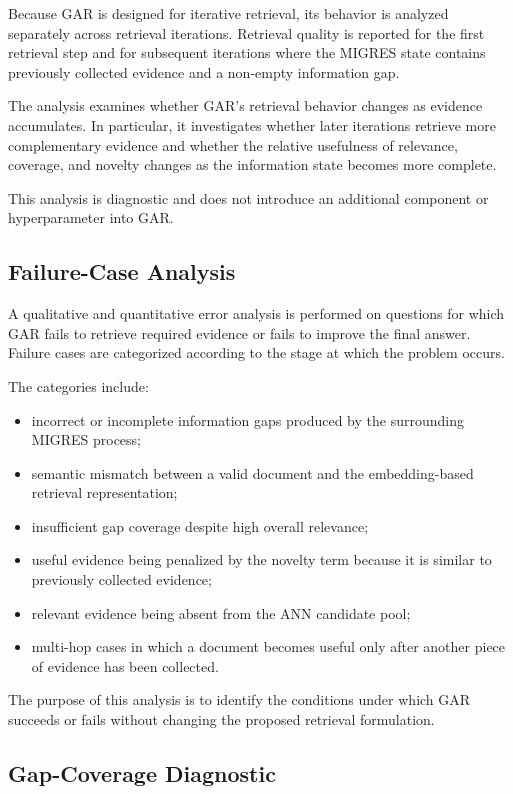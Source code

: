 \documentclass[12pt,a4paper]{report}
\begin{document}
Because GAR is designed for iterative retrieval, its behavior is analyzed separately across retrieval iterations. Retrieval quality is reported for the first retrieval step and for subsequent iterations where the MIGRES state contains previously collected evidence and a non-empty information gap.

The analysis examines whether GAR's retrieval behavior changes as evidence accumulates. In particular, it investigates whether later iterations retrieve more complementary evidence and whether the relative usefulness of relevance, coverage, and novelty changes as the information state becomes more complete.

This analysis is diagnostic and does not introduce an additional component or hyperparameter into GAR.

\subsection{Failure-Case Analysis}

A qualitative and quantitative error analysis is performed on questions for which GAR fails to retrieve required evidence or fails to improve the final answer. Failure cases are categorized according to the stage at which the problem occurs.

The categories include:

\begin{itemize}[leftmargin=1.5em]
\item incorrect or incomplete information gaps produced by the surrounding MIGRES process;
\item semantic mismatch between a valid document and the embedding-based retrieval representation;
\item insufficient gap coverage despite high overall relevance;
\item useful evidence being penalized by the novelty term because it is similar to previously collected evidence;
\item relevant evidence being absent from the ANN candidate pool;
\item multi-hop cases in which a document becomes useful only after another piece of evidence has been collected.
\end{itemize}

The purpose of this analysis is to identify the conditions under which GAR succeeds or fails without changing the proposed retrieval formulation.

\subsection{Gap-Coverage Diagnostic}
\end{document}
